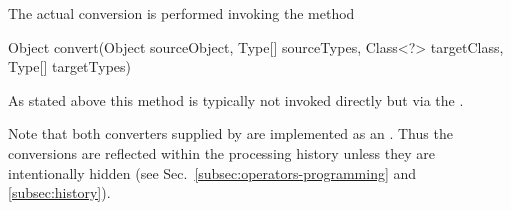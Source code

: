 The actual conversion is performed invoking the method
\begin{code}
Object convert(Object sourceObject, Type[] sourceTypes,
               Class<?> targetClass, Type[] targetTypes)
\end{code}
As stated above this method is typically not invoked directly but via the 
.

Note that both converters supplied by \alida are implemented as an .
Thus the conversions are reflected within the processing history unless
they are intentionally hidden (see Sec.~\ref{subsec:operators-programming} and \ref{subsec:history}).
